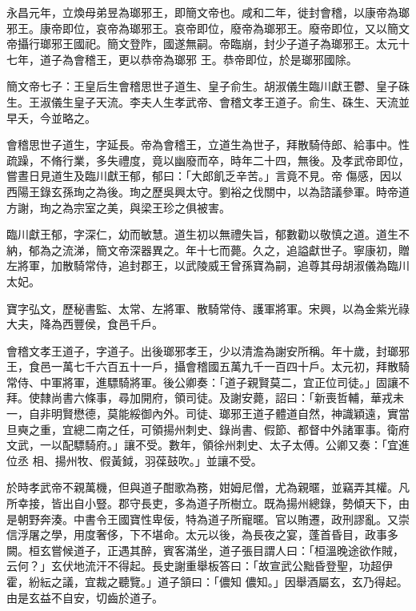 \begin{pinyinscope}
 永昌元年，立煥母弟昱為瑯邪王，即簡文帝也。咸和二年，徙封會稽，以康帝為瑯邪王。康帝即位，哀帝為瑯邪王。哀帝即位，廢帝為瑯邪王。廢帝即位，又以簡文帝攝行瑯邪王國祀。簡文登阼，國遂無嗣。帝臨崩，封少子道子為瑯邪王。太元十七年，道子為會稽王，更以恭帝為瑯邪
 王。恭帝即位，於是瑯邪國除。



 簡文帝七子：王皇后生會稽思世子道生、皇子俞生。胡淑儀生臨川獻王鬱、皇子硃生。王淑儀生皇子天流。李夫人生孝武帝、會稽文孝王道子。俞生、硃生、天流並早夭，今並略之。



 會稽思世子道生，字延長。帝為會稽王，立道生為世子，拜散騎侍郎、給事中。性疏躁，不脩行業，多失禮度，竟以幽廢而卒，時年二十四，無後。及孝武帝即位，嘗晝日見道生及臨川獻王郁，郁曰：「大郎飢乏辛苦。」言竟不見。帝
 傷感，因以西陽王錄玄孫珣之為後。珣之歷吳興太守。劉裕之伐關中，以為諮議參軍。時帝道方謝，珣之為宗室之美，與梁王珍之俱被害。



 臨川獻王郁，字深仁，幼而敏慧。道生初以無禮失旨，郁數勸以敬慎之道。道生不納，郁為之流涕，簡文帝深器異之。年十七而薨。久之，追謚獻世子。寧康初，贈左將軍，加散騎常侍，追封郡王，以武陵威王曾孫寶為嗣，追尊其母胡淑儀為臨川太妃。



 寶字弘文，歷秘書監、太常、左將軍、散騎常侍、護軍將軍。宋興，以為金紫光祿大夫，降為西豐侯，食邑千戶。



 會稽文孝王道子，字道子。出後瑯邪孝王，少以清澹為謝安所稱。年十歲，封瑯邪王，食邑一萬七千六百五十一戶，攝會稽國五萬九千一百四十戶。太元初，拜散騎常侍、中軍將軍，進驃騎將軍。後公卿奏：「道子親賢莫二，宜正位司徒。」固讓不拜。使隸尚書六條事，尋加開府，領司徒。及謝安薨，詔曰：「新喪哲輔，華戎未一，自非明賢懋德，莫能綏御內外。司徒、瑯邪王道子體道自然，神識穎遠，實當旦奭之重，宜總二南之任，可領揚州刺史、錄尚書、假節、都督中外諸軍事。衛府文武，一以配驃騎府。」讓不受。數年，領徐州刺史、太子太傅。公卿又奏：「宜進位丞
 相、揚州牧、假黃鉞，羽葆鼓吹。」並讓不受。



 於時孝武帝不親萬機，但與道子酣歌為務，姏姆尼僧，尤為親暱，並竊弄其權。凡所幸接，皆出自小豎。郡守長吏，多為道子所樹立。既為揚州總錄，勢傾天下，由是朝野奔湊。中書令王國寶性卑佞，特為道子所寵暱。官以賄遷，政刑謬亂。又崇信浮屠之學，用度奢侈，下不堪命。太元以後，為長夜之宴，蓬首昏目，政事多闕。桓玄嘗候道子，正遇其醉，賓客滿坐，道子張目謂人曰：「桓溫晚途欲作賊，云何？」玄伏地流汗不得起。長史謝重舉板答曰：「故宣武公黜昏登聖，功超伊霍，紛紜之議，宜裁之聽覽。」道子頷曰：「儂知
 儂知。」因舉酒屬玄，玄乃得起。由是玄益不自安，切齒於道子。




\end{pinyinscope}
